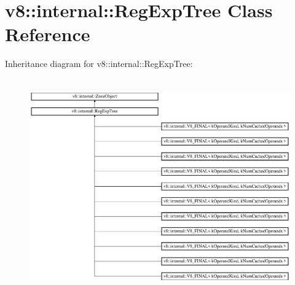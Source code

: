\hypertarget{classv8_1_1internal_1_1_reg_exp_tree}{}\section{v8\+:\+:internal\+:\+:Reg\+Exp\+Tree Class Reference}
\label{classv8_1_1internal_1_1_reg_exp_tree}
Inheritance diagram for v8\+:\+:internal\+:\+:Reg\+Exp\+Tree\+:\begin{figure}[H]
\begin{center}
\leavevmode
\includegraphics[height=9.285714cm]{classv8_1_1internal_1_1_reg_exp_tree}
\end{center}
\end{figure}
